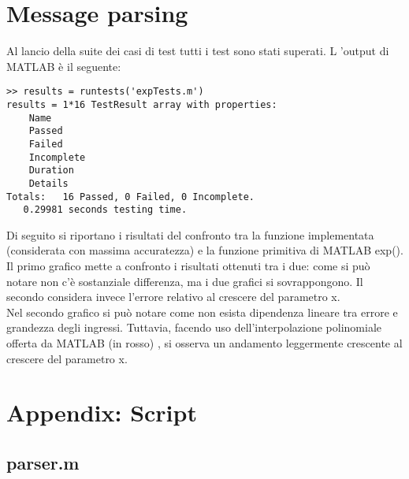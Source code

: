 \documentclass[a4paper,titlepage]{article}
\begin{document}
\section{Message parsing}

Al lancio della suite dei casi di test tutti i test sono stati superati. L 'output di MATLAB è il seguente:
\begin{lstlisting}[caption=Risultati]
>> results = runtests('expTests.m')
results = 1*16 TestResult array with properties:
    Name
    Passed
    Failed
    Incomplete
    Duration
    Details
Totals:   16 Passed, 0 Failed, 0 Incomplete.
   0.29981 seconds testing time.
\end{lstlisting}

\clearpage

Di seguito si riportano i risultati del confronto tra la funzione implementata (considerata con massima accuratezza) e la funzione primitiva di MATLAB exp().
Il primo grafico mette a confronto i risultati ottenuti tra i due: come si può notare non c'è sostanziale differenza, ma i due grafici si sovrappongono.
Il secondo considera invece l'errore relativo al crescere del parametro x.\\
Nel secondo grafico si  può notare come non esista dipendenza lineare tra errore e grandezza degli ingressi. Tuttavia,
facendo uso dell'interpolazione polinomiale offerta da MATLAB (in rosso) , si osserva un andamento leggermente crescente al crescere del parametro x.

\clearpage
\appendix
\section{Appendix: Script}
\subsection{parser.m}
{\tt  }
\end{document}
